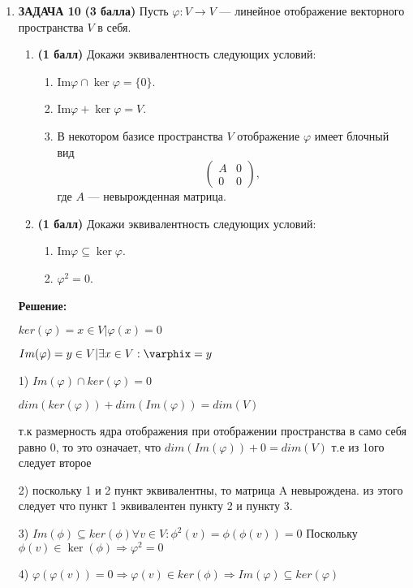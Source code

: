 \documentclass[a4paper,12pt]{article}
\begin{document}
\begin{enumerate}
    

    \item \textbf{ЗАДАЧА 10} \textbf{(3 балла)} Пусть $\varphi: V \to V$ — линейное отображение векторного пространства $V$ в себя.
    \begin{enumerate}
        \item \textbf{(1 балл)} Докажи эквивалентность следующих условий:
        \begin{enumerate}
            \item $\text{Im} \varphi \cap \ker \varphi = \{0\}$.
            \item $\text{Im} \varphi + \ker \varphi = V$.
            \item В некотором базисе пространства $V$ отображение $\varphi$ имеет блочный вид
            \[
            \begin{pmatrix}
            A & 0 \\
            0 & 0 
            \end{pmatrix},
            \]
            где $A$ — невырожденная матрица.
        \end{enumerate}
        \item \textbf{(1 балл)} Докажи эквивалентность следующих условий:
        \begin{enumerate}
            \item $\text{Im} \varphi \subseteq \ker \varphi$.
            \item $\varphi^2 = 0$.
        \end{enumerate}
    \end{enumerate}
    
    \textbf{Решение: }

    $ker(\varphi)={x \in V| \varphi(x)=0}$

    $Im(\varphi)={y\in V|\exists x \in V: \varphix=y}$

    1) $Im(\varphi) \cap ker(\varphi) = 0$

    $dim(ker(\varphi)) + dim(Im(\varphi)) = dim(V)$
    
    т.к размерность ядра отображения при отображении пространства в само себя равно 0, то это означает, что $dim(Im(\varphi)) + 0 = dim(V)$ т.е из 1ого следует второе

    2) поскольку 1 и 2 пункт эквивалентны, то матрица A невырождена. из этого следует что пункт 1 эквивалентен пункту 2 и пункту 3.

    3) $Im(\phi ) \subseteq ker(\phi) \forall v \in V: \phi^2(v) = \phi(\phi(v))=0$ Поскольку $\phi(v) \in \ker(\phi) \Rightarrow \varphi^2 = 0$

    4) $\varphi(\varphi(v))=0 \Rightarrow \varphi(v) \in ker(\phi) \Rightarrow Im(\varphi) \subseteq ker(\varphi)$

\end{enumerate}
\end{document}
